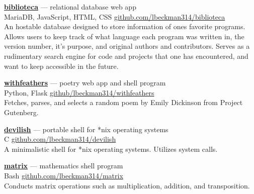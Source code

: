 \documentclass[a4paper]{article}
\begin{document}
\textcolor[HTML]{4635f7}{\textbf{\href{https://biblioteca.liambeckman.com}{biblioteca}}} --- relational database web app\\
\textcolor[RGB]{128,128,128}{MariaDB, JavaScript, HTML, CSS \hfill \href{https://github.com/lbeckman314/biblioteca}{github.com/lbeckman314/biblioteca}}\\

An hostable database designed to store information of ones favorite programs. Allows users to keep track of what language each program was written in, the version number, it’s purpose, and original authors and contributors. Serves as a rudimentary search engine for code and projects that one has encountered, and want to keep accessible in the future.


\textcolor[RGB]{128,128,128}{\dotfill}
\medbreak

\textcolor[HTML]{4635f7}{\textbf{\href{https://withfeathers.liambeckman.com}{withfeathers}}} --- poetry web app and shell program\\
\textcolor[RGB]{128,128,128}{Python, Flask \hfill \href{https://github.com/lbeckman314/withfeathers}{github/lbeckman314/withfeathers}}\\

Fetches, parses, and selects a random poem by Emily Dickinson from Project Gutenberg.

\textcolor[RGB]{128,128,128}{\dotfill}
\medbreak

\textcolor[HTML]{4635f7}{\textbf{\href{https://liambeckman.com/code/devilish}{devilish}}} --- portable shell for *nix operating systems\\
\textcolor[RGB]{128,128,128}{C \hfill \href{https://github.com/lbeckman314/devilsh}{github.com/lbeckman314/devilish}}\\

A minimalistic shell for *nix operating systems. Utilizes system calls.

\textcolor[RGB]{128,128,128}{\dotfill}
\medbreak

\textcolor[HTML]{4635f7}{\textbf{\href{https://liambeckman.com/code/matrix}{matrix}}} --- mathematics shell program\\
\textcolor[RGB]{128,128,128}{Bash \hfill \href{https://github.com/lbeckman314/matrix}{github.com/lbeckman314/matrix}}\\

Conducts matrix operations such as multiplication, addition, and transposition.

\textcolor[RGB]{128,128,128}{\dotfill}
\medbreak
\end{document}

